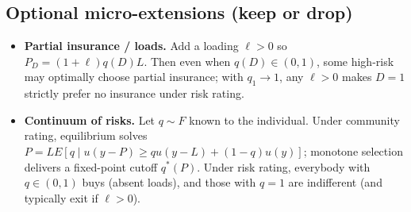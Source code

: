 \documentclass[12pt]{article}
\theoremstyle{plain}
\theoremstyle{plain}
\begin{document}
\subsection*{Optional micro-extensions (keep or drop)}
\begin{itemize}
    \item \textbf{Partial insurance / loads.} Add a loading $\ell > 0$ so $P_D = (1+\ell)q(D)L$. Then even when $q(D) \in (0,1)$, some high-risk may optimally choose partial insurance; with $q_1 \to 1$, any $\ell > 0$ makes $D=1$ strictly prefer no insurance under risk rating.
    \item \textbf{Continuum of risks.} Let $q \sim F$ known to the individual. Under community rating, equilibrium solves $P = L E[q \mid u(y-P) \ge q u(y-L) + (1-q) u(y)]$; monotone selection delivers a fixed-point cutoff $q^*(P)$. Under risk rating, everybody with $q \in (0,1)$ buys (absent loads), and those with $q=1$ are indifferent (and typically exit if $\ell > 0$).
\end{itemize}
\end{document}
